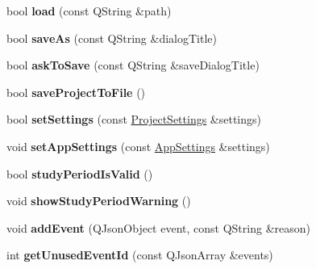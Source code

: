 \begin{DoxyCompactItemize}
\item 
\hypertarget{class_project_a969c7c0146c82f61c6fd12fed341ff30}{bool {\bfseries load} (const Q\-String \&path)}\label{class_project_a969c7c0146c82f61c6fd12fed341ff30}

\item 
\hypertarget{class_project_a2380b1e5f2ab6d55eba6ef57fc2ed254}{bool {\bfseries save\-As} (const Q\-String \&dialog\-Title)}\label{class_project_a2380b1e5f2ab6d55eba6ef57fc2ed254}

\item 
\hypertarget{class_project_a79234d23287d11b51a1678adb813f3a7}{bool {\bfseries ask\-To\-Save} (const Q\-String \&save\-Dialog\-Title)}\label{class_project_a79234d23287d11b51a1678adb813f3a7}

\item 
\hypertarget{class_project_a8e74b7fa15acfc9e5bb3fd7a46c8567b}{bool {\bfseries save\-Project\-To\-File} ()}\label{class_project_a8e74b7fa15acfc9e5bb3fd7a46c8567b}

\item 
\hypertarget{class_project_a8883a9a8a8d50019208c4b65d07fa9a8}{bool {\bfseries set\-Settings} (const \hyperlink{class_project_settings}{Project\-Settings} \&settings)}\label{class_project_a8883a9a8a8d50019208c4b65d07fa9a8}

\item 
\hypertarget{class_project_a257b934a7b187f97832dd339c88b7d18}{void {\bfseries set\-App\-Settings} (const \hyperlink{class_app_settings}{App\-Settings} \&settings)}\label{class_project_a257b934a7b187f97832dd339c88b7d18}

\item 
\hypertarget{class_project_a30a776dbb9281c8e6f98f88037f49997}{bool {\bfseries study\-Period\-Is\-Valid} ()}\label{class_project_a30a776dbb9281c8e6f98f88037f49997}

\item 
\hypertarget{class_project_aa269c078dd37a66a94c0c3b673048a82}{void {\bfseries show\-Study\-Period\-Warning} ()}\label{class_project_aa269c078dd37a66a94c0c3b673048a82}

\item 
\hypertarget{class_project_a80ebc683095c87b9c904d51a15086db3}{void {\bfseries add\-Event} (Q\-Json\-Object event, const Q\-String \&reason)}\label{class_project_a80ebc683095c87b9c904d51a15086db3}

\item 
\hypertarget{class_project_a880fae727389dc16b322d2a29276d390}{int {\bfseries get\-Unused\-Event\-Id} (const Q\-Json\-Array \&events)}\label{class_project_a880fae727389dc16b322d2a29276d390}


\end{DoxyCompactItemize}
